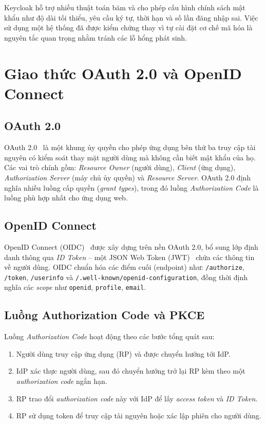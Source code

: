 Keycloak hỗ trợ nhiều thuật toán băm và cho phép cấu hình chính sách mật khẩu
như độ dài tối thiểu, yêu cầu ký tự, thời hạn và số lần đăng nhập sai. Việc sử
dụng một hệ thống đã được kiểm chứng thay vì tự cài đặt cơ chế mã hóa là
nguyên tắc quan trọng nhằm tránh các lỗ hổng phát sinh.

\section{Giao thức OAuth 2.0 và OpenID Connect}
\label{sec:oidc}

\subsection{OAuth 2.0}

OAuth 2.0~\cite{rfc6749} là một khung ủy quyền cho phép ứng dụng bên thứ ba
truy cập tài nguyên có kiểm soát thay mặt người dùng mà không cần biết mật
khẩu của họ. Các vai trò chính gồm: \textit{Resource Owner} (người dùng),
\textit{Client} (ứng dụng), \textit{Authorization Server} (máy chủ ủy quyền) và
\textit{Resource Server}. OAuth 2.0 định nghĩa nhiều luồng cấp quyền
(\textit{grant types}), trong đó luồng \textit{Authorization Code} là luồng phù
hợp nhất cho ứng dụng web.

\subsection{OpenID Connect}

OpenID Connect (OIDC)~\cite{oidccore} được xây dựng trên nền OAuth 2.0, bổ
sung lớp định danh thông qua \textit{ID Token} -- một JSON Web Token
(JWT)~\cite{rfc7519} chứa các thông tin về người dùng. OIDC chuẩn hóa các
điểm cuối (endpoint) như: \texttt{/authorize}, \texttt{/token},
\texttt{/userinfo} và \texttt{/.well-known/openid-configuration}, đồng thời
định nghĩa các \textit{scope} như \texttt{openid}, \texttt{profile},
\texttt{email}.

\subsection{Luồng Authorization Code và PKCE}

Luồng \textit{Authorization Code} hoạt động theo các bước tổng quát sau:

\begin{enumerate}
  \item Người dùng truy cập ứng dụng (RP) và được chuyển hướng tới IdP.
  \item IdP xác thực người dùng, sau đó chuyển hướng trở lại RP kèm theo một
  \textit{authorization code} ngắn hạn.
  \item RP trao đổi \textit{authorization code} này với IdP để lấy
  \textit{access token} và \textit{ID Token}.
  \item RP sử dụng token để truy cập tài nguyên hoặc xác lập phiên cho người
  dùng.
\end{enumerate}

